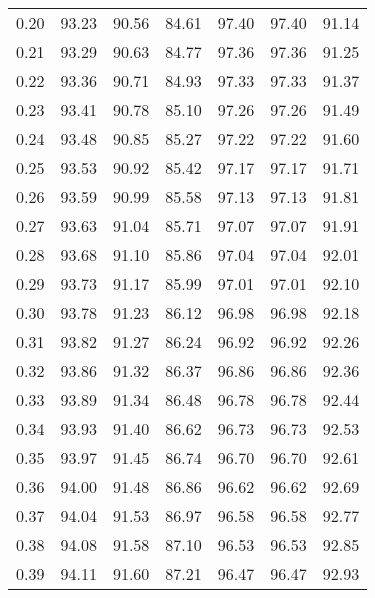 \begin{tabular}{|c|c|c|c|c|c|c|}
      0.20 &     93.23 &     90.56 &      84.61 &   97.40 &      97.40 &         91.14 \\
      0.21 &     93.29 &     90.63 &      84.77 &   97.36 &      97.36 &         91.25 \\
      0.22 &     93.36 &     90.71 &      84.93 &   97.33 &      97.33 &         91.37 \\
      0.23 &     93.41 &     90.78 &      85.10 &   97.26 &      97.26 &         91.49 \\
      0.24 &     93.48 &     90.85 &      85.27 &   97.22 &      97.22 &         91.60 \\
      0.25 &     93.53 &     90.92 &      85.42 &   97.17 &      97.17 &         91.71 \\
      0.26 &     93.59 &     90.99 &      85.58 &   97.13 &      97.13 &         91.81 \\
      0.27 &     93.63 &     91.04 &      85.71 &   97.07 &      97.07 &         91.91 \\
      0.28 &     93.68 &     91.10 &      85.86 &   97.04 &      97.04 &         92.01 \\
      0.29 &     93.73 &     91.17 &      85.99 &   97.01 &      97.01 &         92.10 \\
      0.30 &     93.78 &     91.23 &      86.12 &   96.98 &      96.98 &         92.18 \\
      0.31 &     93.82 &     91.27 &      86.24 &   96.92 &      96.92 &         92.26 \\
      0.32 &     93.86 &     91.32 &      86.37 &   96.86 &      96.86 &         92.36 \\
      0.33 &     93.89 &     91.34 &      86.48 &   96.78 &      96.78 &         92.44 \\
      0.34 &     93.93 &     91.40 &      86.62 &   96.73 &      96.73 &         92.53 \\
      0.35 &     93.97 &     91.45 &      86.74 &   96.70 &      96.70 &         92.61 \\
      0.36 &     94.00 &     91.48 &      86.86 &   96.62 &      96.62 &         92.69 \\
      0.37 &     94.04 &     91.53 &      86.97 &   96.58 &      96.58 &         92.77 \\
      0.38 &     94.08 &     91.58 &      87.10 &   96.53 &      96.53 &         92.85 \\
      0.39 &     94.11 &     91.60 &      87.21 &   96.47 &      96.47 &         92.93 \\

\end{tabular}
